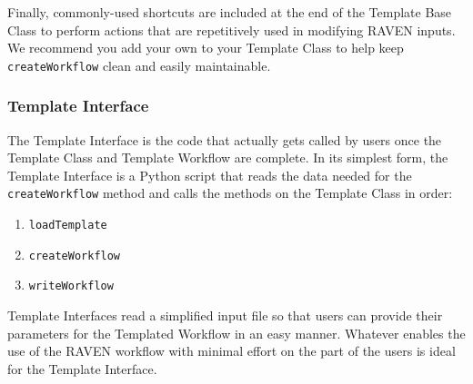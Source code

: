 Finally, commonly-used shortcuts are included at the end of the Template Base Class to perform actions that are
%
repetitively used in modifying RAVEN inputs. We recommend you add your own to your Template Class to help keep
%
\texttt{createWorkflow} clean and easily maintainable.



\subsubsection{Template Interface}
%
The Template Interface is the code that actually gets called by users once the Template Class and Template Workflow are
%
complete. In its simplest form, the Template Interface is a Python script that reads the data needed for the
%
\texttt{createWorkflow} method and calls the methods on the Template Class in order:
%
\begin{enumerate}
  \item \texttt{loadTemplate}
  \item \texttt{createWorkflow}
  \item \texttt{writeWorkflow}
\end{enumerate}
%
Template Interfaces read a simplified input file so that users can provide their parameters for the Templated Workflow
%
in an easy manner. Whatever enables the use of the RAVEN workflow with minimal effort on the part of the users is ideal
%
for the Template Interface.





